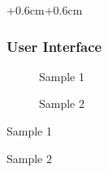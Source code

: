 \documentclass[english]{article}
\begin{document}
\begin{adjustwidth*}{+0.6cm}{+0.6cm}
\subsubsection{User Interface}

\begin{figure}[H]
\protect\caption{Sample 1}


\end{figure}


\begin{figure}[H]


\protect\caption{Sample 2}


\end{figure}


\begin{table}[H]


\protect\caption{Sample 1}


\end{table}


\begin{table}[H]


\protect\caption{Sample 2}


\end{table}


\end{adjustwidth*}
\end{document}
